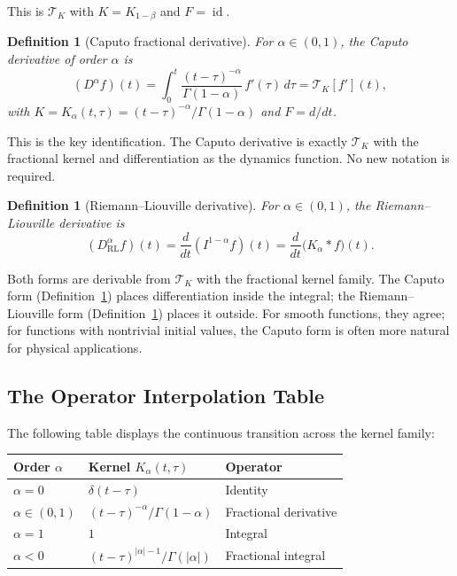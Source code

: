 \documentclass[12pt]{article}
\newtheorem{definition}[theorem]{Definition}
\DeclareMathOperator{\id}{id}
\newcommand{\TK}{\mathcal{T}_K}
\begin{document}
This is $\TK$ with $K = K_{1-\beta}$ and $F = \id$.

\begin{definition}[Caputo fractional derivative]
\label{def:caputo}
For $\alpha \in (0,1)$, the \emph{Caputo derivative of order $\alpha$} is
\[
  (D^\alpha f)(t)
  = \int_0^t \frac{(t-\tau)^{-\alpha}}{\Gamma(1-\alpha)}\, f'(\tau)\, d\tau
  = \TK[f'](t),
\]
with $K = K_\alpha(t,\tau) = (t-\tau)^{-\alpha}/\Gamma(1-\alpha)$ and
$F = d/dt$.
\end{definition}

This is the key identification. The Caputo derivative is exactly $\TK$
with the fractional kernel and differentiation as the dynamics function.
No new notation is required.

\begin{definition}[Riemann--Liouville derivative]
\label{def:rl}
For $\alpha \in (0,1)$, the \emph{Riemann--Liouville derivative} is
\[
  (D^\alpha_{\mathrm{RL}} f)(t)
  = \frac{d}{dt}(I^{1-\alpha} f)(t)
  = \frac{d}{dt}\bigl(K_\alpha * f\bigr)(t).
\]
\end{definition}

Both forms are derivable from $\TK$ with the fractional kernel family.
The Caputo form (Definition~\ref{def:caputo}) places differentiation
inside the integral; the Riemann--Liouville form (Definition~\ref{def:rl})
places it outside. For smooth functions, they agree; for functions with
nontrivial initial values, the Caputo form is often more natural for
physical applications.

\subsection{The Operator Interpolation Table}

The following table displays the continuous transition across the kernel
family:

\medskip
\begin{center}
\renewcommand{\arraystretch}{1.5}
\begin{tabular}{lll}
\toprule
\textbf{Order $\alpha$} & \textbf{Kernel $K_\alpha(t,\tau)$} & \textbf{Operator} \\
\midrule
$\alpha = 0$ & $\delta(t-\tau)$ & Identity \\
$\alpha \in (0,1)$ & $(t-\tau)^{-\alpha}/\Gamma(1-\alpha)$ & Fractional derivative \\
$\alpha = 1$ & $1$ & Integral \\
$\alpha < 0$ & $(t-\tau)^{|\alpha|-1}/\Gamma(|\alpha|)$ & Fractional integral \\
\bottomrule
\end{tabular}
\end{center}
\medskip
\end{document}
